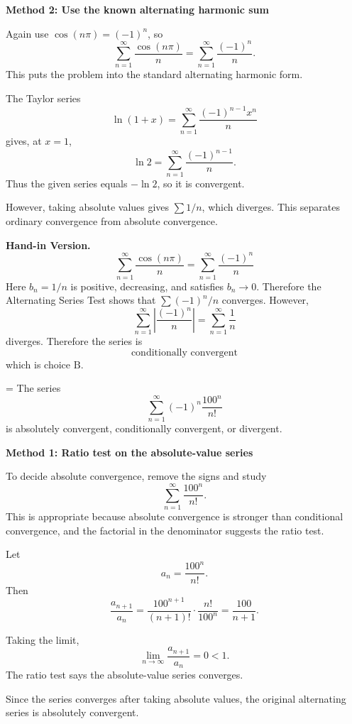 \documentclass[a4paper,12pt,twocolumn]{article}
\newlength{\problemnumberwidth}
\newenvironment{solutionbox}{\begin{framed}}{\end{framed}}
\newcommand{\problem}[3]{%
  \Needspace{10\baselineskip}%
  \phantomsection\label{#1}%
  \par\vspace{0.8em}%
  \noindent
  \hangindent=\problemnumberwidth
  \hangafter=1
  \makebox[\problemnumberwidth][l]{\textbf{#2.}}#3\par
}
\begin{document}
\begin{solutionbox}
\textbf{Method 2: Use the known alternating harmonic sum}

\begin{steps}
\item Again use \(\cos(n\pi)=(-1)^n\), so
\[
\sum_{n=1}^{\infty}\frac{\cos(n\pi)}{n}
=\sum_{n=1}^{\infty}\frac{(-1)^n}{n}.
\]
This puts the problem into the standard alternating harmonic form.

\item The Taylor series
\[
\ln(1+x)=\sum_{n=1}^{\infty}\frac{(-1)^{n-1}x^n}{n}
\]
gives, at \(x=1\),
\[
\ln 2=\sum_{n=1}^{\infty}\frac{(-1)^{n-1}}{n}.
\]
Thus the given series equals \(-\ln 2\), so it is convergent.

\item However, taking absolute values gives \(\sum 1/n\), which diverges. This separates ordinary convergence from absolute convergence.
\end{steps}

\textbf{Hand-in Version.}
\[
\sum_{n=1}^{\infty}\frac{\cos(n\pi)}{n}
=\sum_{n=1}^{\infty}\frac{(-1)^n}{n}
\]
Here \(b_n=1/n\) is positive, decreasing, and satisfies \(b_n\to0\). Therefore the Alternating Series Test shows that
\(\sum (-1)^n/n\) converges. However,
\[
\sum_{n=1}^{\infty}\left|\frac{(-1)^n}{n}\right|
=\sum_{n=1}^{\infty}\frac1n
\]
diverges. Therefore the series is
\[
\boxed{\text{conditionally convergent}}
\]
which is choice \(\boxed{\text{B}}\).
\end{solutionbox}

\problem{prob:v}{v}{The series
\[
\sum_{n=1}^{\infty}(-1)^n\frac{100^n}{n!}
\]
is absolutely convergent, conditionally convergent, or divergent.}

\begin{solutionbox}
\textbf{Method 1: Ratio test on the absolute-value series}

\begin{steps}
\item To decide absolute convergence, remove the signs and study
\[
\sum_{n=1}^{\infty}\frac{100^n}{n!}.
\]
This is appropriate because absolute convergence is stronger than conditional convergence, and the factorial in the denominator suggests the ratio test.

\item Let
\[
a_n=\frac{100^n}{n!}.
\]
Then
\[
\frac{a_{n+1}}{a_n}
=\frac{100^{n+1}}{(n+1)!}\cdot \frac{n!}{100^n}
=\frac{100}{n+1}.
\]

\item Taking the limit,
\[
\lim_{n\to\infty}\frac{a_{n+1}}{a_n}=0<1.
\]
The ratio test says the absolute-value series converges.

\item Since the series converges after taking absolute values, the original alternating series is absolutely convergent.
\end{steps}
\end{solutionbox}
\end{document}
